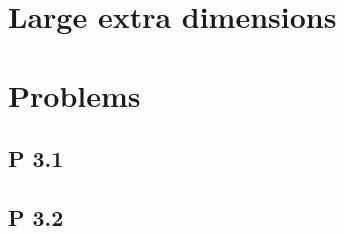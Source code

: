 \documentclass[12pt]{report}
\begin{document}
\section{Large extra dimensions}
\section{Problems}
\subsection*{P 3.1}

\subsection*{P 3.2}

\subsection{}
\end{document}
